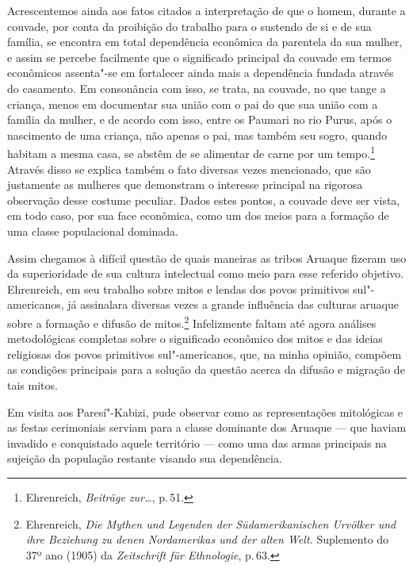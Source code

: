Acrescentemos ainda aos fatos citados a interpretação de que o homem,
durante a couvade, por conta da proibição do trabalho para o sustendo
de si e de sua família, se encontra em total dependência econômica da
parentela da sua mulher, e assim se percebe facilmente que o
significado principal da couvade em termos econômicos assenta"-se em
fortalecer ainda mais a dependência fundada através do casamento. Em
consonância com isso, se trata, na couvade, no que tange a criança, menos
em documentar sua união com o pai do que sua união com a família da
mulher, e de acordo com isso, entre os Paumari no rio Purus, após o
nascimento de uma criança, não apenas o pai, mas também seu sogro,
quando habitam a mesma casa, se abstêm de se alimentar de carne por
um tempo.\footnote{Ehrenreich, \textit{Beiträge zur\ldots}, p.\,51.} Através disso se explica também o fato diversas vezes
mencionado, que são justamente as mulheres que demonstram o interesse
principal na rigorosa observação desse costume peculiar. Dados estes pontos, 
a couvade deve ser vista, em todo caso, por sua face econômica,
como um dos meios para a formação de uma classe populacional dominada.

Assim chegamos à difícil questão de quais maneiras as tribos Aruaque
fizeram uso da superioridade de sua cultura intelectual como meio para
esse referido objetivo. Ehrenreich, em seu trabalho sobre mitos e lendas
dos povos primitivos sul"-americanos, já assinalara diversas vezes a
grande influência das culturas aruaque sobre a formação e difusão de
mitos.\footnote{Ehrenreich, \textit{Die Mythen und Legenden der
  Südamerikanischen Urvölker und ihre Beziehung zu denen Nordamerikas
  und der alten Welt.} Suplemento do 37º ano (1905) da \textit{Zeitschrift
  für Ethnologie}, p.\,63.} Infelizmente faltam até agora análises 
  metodológicas completas sobre o significado econômico dos mitos e das
ideias religiosas dos povos primitivos sul"-americanos, que, na minha
opinião, compõem as condições principais para a solução da questão
acerca da difusão e migração de tais mitos.

Em visita aos Paresí"-Kabizi, pude observar como as
representações mitológicas e as festas cerimoniais serviam para a
classe dominante dos Aruaque --- que haviam invadido e conquistado
aquele território --- como uma das armas principais na sujeição da
população restante visando sua dependência.

